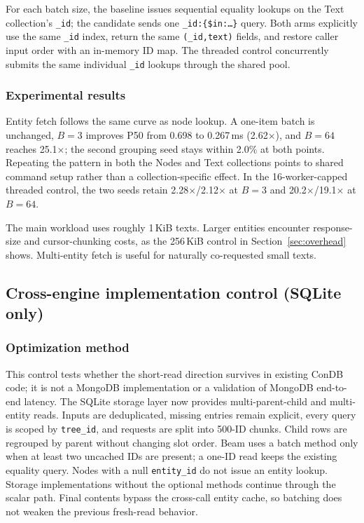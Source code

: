 \documentclass[10pt]{article}
\newcommand{\code}[1]{\texttt{#1}}
\begin{document}
For each batch size, the baseline issues sequential equality lookups on the
Text collection's \code{\_id}; the candidate sends one
\code{\_id:\{\$in:\ldots\}} query. Both arms explicitly use the same
\code{\_id} index, return the same \code{(\_id,text)} fields, and restore caller
input order with an in-memory ID map. The threaded control concurrently submits
the same individual \code{\_id} lookups through the shared pool.

\subsubsection{Experimental results}

Entity fetch follows the same curve as node lookup. A one-item batch is
unchanged, $B=3$ improves P50 from 0.698 to 0.267\,ms
(2.62$\times$), and $B=64$ reaches 25.1$\times$; the second grouping seed
stays within 2.0\% at both points. Repeating the pattern in both the Nodes and
Text collections points to shared command setup rather than a
collection-specific effect. In the 16-worker-capped threaded control, the two seeds retain
2.28$\times$/2.12$\times$ at $B=3$ and
20.2$\times$/19.1$\times$ at $B=64$.

The main workload uses roughly 1\,KiB texts. Larger entities encounter
response-size and cursor-chunking costs, as the 256\,KiB control in
Section~\ref{sec:overhead} shows. Multi-entity fetch is useful for naturally
co-requested small texts.

\subsection{Cross-engine implementation control (SQLite only)}\label{sec:opt-production}

\subsubsection{Optimization method}

This control tests whether the short-read direction survives in existing ConDB
code; it is not a MongoDB implementation or a validation of MongoDB end-to-end
latency. The SQLite storage layer now provides multi-parent-child and multi-entity
reads. Inputs are deduplicated, missing entries remain explicit, every query is
scoped by \code{tree\_id}, and requests are split into 500-ID chunks. Child
rows are regrouped by parent without changing slot order. Beam uses a batch
method only when at least two uncached IDs are present; a one-ID read keeps the
existing equality query. Nodes with a null \code{entity\_id} do not issue an
entity lookup. Storage implementations without the optional methods continue
through the scalar path. Final contents bypass the cross-call entity cache, so
batching does not weaken the previous fresh-read behavior.
\end{document}
